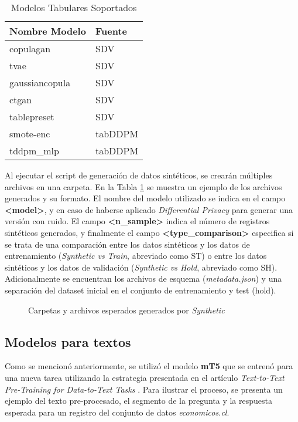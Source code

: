 \begin{table}[H]
	\centering
	\caption{Modelos Tabulares Soportados}
	\label{modelos-tab-soportados}
    \begin{tabular}{|l|l|}
        \hline
        \rowcolor[gray]{0.8}
        Nombre Modelo & Fuente \\
        \hline
        copulagan & SDV \cite{kotelnikov_overview_nodate} \\
        \hline
        tvae & SDV \cite{kotelnikov_overview_nodate} \\
        \hline
        gaussiancopula & SDV \cite{kotelnikov_overview_nodate} \\
        \hline
        ctgan & SDV \cite{kotelnikov_overview_nodate} \\
        \hline
        tablepreset & SDV \cite{kotelnikov_overview_nodate} \\
        \hline
        smote-enc & tabDDPM \cite{akim_tabddpm_2023} \\
        \hline
        tddpm\_mlp & tabDDPM \cite{akim_tabddpm_2023} \\
        \hline
      \end{tabular}        
\end{table} 

Al ejecutar el script de generación de datos sintéticos, se crearán múltiples archivos en una carpeta. En la Tabla \ref{synth-folders} se muestra un ejemplo de los archivos generados y su formato. El nombre del modelo utilizado se indica en el campo \textbf{<model>}, y en caso de haberse aplicado \emph{Differential Privacy} para generar una versión con ruido. El campo \textbf{<n\_sample>} indica el número de registros sintéticos generados, y finalmente el campo \textbf{<type\_comparison>} especifica si se trata de una comparación entre los datos sintéticos y los datos de entrenamiento (\emph{Synthetic vs Train}, abreviado como ST) o entre los datos sintéticos y los datos de validación (\emph{Synthetic vs Hold}, abreviado como SH). Adicionalmente se encuentran los archivos de esquema (\emph{metadata.json}) y una separación del dataset inicial en el conjunto de entrenamiento y test (hold).
\begin{figure}[H]
	\centering
	
	\caption{Carpetas y archivos esperados generados por \emph{Synthetic}}
	\label{synth-folders}
\end{figure}


\newpage
\subsection{Modelos para textos}
Como se mencionó anteriormente, se utilizó el modelo \textbf{mT5} que se entrenó para una nueva tarea utilizando la estrategia presentada en el artículo \emph{Text-to-Text Pre-Training for Data-to-Text Tasks} \cite{kale_text--text_2020}. Para ilustrar el proceso, se presenta un ejemplo del texto pre-procesado, el segmento de la pregunta y la respuesta esperada para un registro del conjunto de datos \emph{economicos.cl}.

